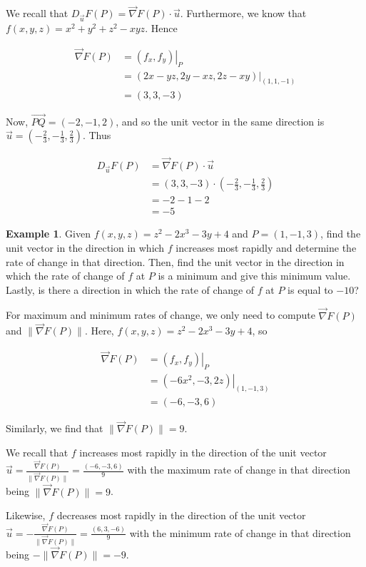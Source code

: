 \documentclass[11pt]{article}
\theoremstyle{plain} %
\theoremstyle{definition}
\theoremstyle{example}
\newtheorem*{example}{Example}
\theoremstyle{remark}
\begin{document}
We recall that $D_{\vec{u}}F(P) = \vec{\nabla}F(P)\cdot \vec{u}$. Furthermore, we know that $f(x,y,z) = x^2 + y^2 + z^2 -xyz$. Hence

\begin{align*}
	\vec{\nabla}F(P) &= \left.(f_x,f_y)\right|_P\\
	&= \left.(2x-yz, 2y-xz, 2z-xy)\right|_{(1, 1, -1)}\\
	&= (3, 3, -3)
\end{align*}

Now, $\overrightarrow{PQ} = (-2, -1, 2)$, and so the unit vector in the same direction is $\vec{u} = \left(-\frac{2}{3}, -\frac{1}{3}, \frac{2}{3}\right)$. Thus


\begin{align*}
	D_{\vec{u}}F(P) &= \vec{\nabla}F(P)\cdot \vec{u}\\
	&= (3, 3, -3) \cdot \left(-\frac{2}{3}, -\frac{1}{3}, \frac{2}{3}\right)\\
	&= -2-1-2\\
	&= -5
\end{align*}

\begin{example}
Given $f(x,y,z) = z^2-2x^3-3y+4$ and $P=(1,-1,3)$, find the unit vector in the direction in which $f$ increases most rapidly and determine the rate of change in that direction. Then, find the unit vector in the direction in which the rate of change of $f$ at $P$ is a minimum and give this minimum value. Lastly, is there a direction in which the rate of change of $f$ at $P$ is equal to $-10$?
\end{example}

For maximum and minimum rates of change, we only need to compute $\vec{\nabla}F(P)$ and $\|\vec{\nabla}F(P)\|$. Here, $f(x,y,z) = z^2 -2x^3-3y+4$, so 

\begin{align*}
	\vec{\nabla}F(P) &= \left.(f_x,f_y)\right|_P\\
	&= \left.(-6x^2, -3, 2z)\right|_{(1, -1, 3)}\\
	&= (-6, -3, 6)
\end{align*}

Similarly, we find that $\|\vec{\nabla}F(P)\| = 9$. 

We recall that $f$ increases most rapidly in the direction of the unit vector $\vec{u} = \frac{\vec{\nabla}F(P)}{\|\vec{\nabla}F(P)\|} = \frac{(-6,-3,6)}{9}$ with the maximum rate of change in that direction being $\|\vec{\nabla}F(P)\| = 9$. 

Likewise, $f$ decreases most rapidly in the direction of the unit vector $\vec{u} = -\frac{\vec{\nabla}F(P)}{\|\vec{\nabla}F(P)\|} = \frac{(6,3,-6)}{9}$ with the minimum rate of change in that direction being $-\|\vec{\nabla}F(P)\| = -9$.
\end{document}

